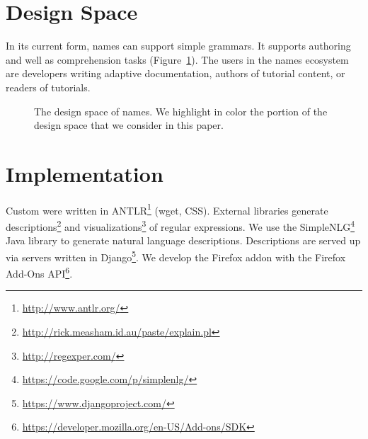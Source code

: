 \section{Design Space}

In its current form, \glspl{name} can support simple grammars.
It supports authoring and well as comprehension tasks (Figure~\ref{fig:design_space}).
The users in the \glspl{name} ecosystem are developers writing adaptive documentation, authors of tutorial content, or readers of tutorials.

\begin{figure}
\caption{
The design space of \glspl{name}.  We highlight in color the portion of the design space that we consider in this paper.
}
\label{fig:design_space}
\end{figure}

\section{Implementation}

Custom were written in ANTLR\footnote{\url{http://www.antlr.org/}} (wget, CSS).
External libraries generate descriptions\footnote{\url{http://rick.measham.id.au/paste/explain.pl}} and visualizations\footnote{\url{http://regexper.com/}} of regular expressions.
We use the SimpleNLG\footnote{\url{https://code.google.com/p/simplenlg/}} Java library to generate natural language descriptions.
Descriptions are served up via servers written in Django\footnote{\url{https://www.djangoproject.com/}}.
We develop the Firefox addon with the Firefox Add-Ons API\footnote{\url{https://developer.mozilla.org/en-US/Add-ons/SDK}}.
